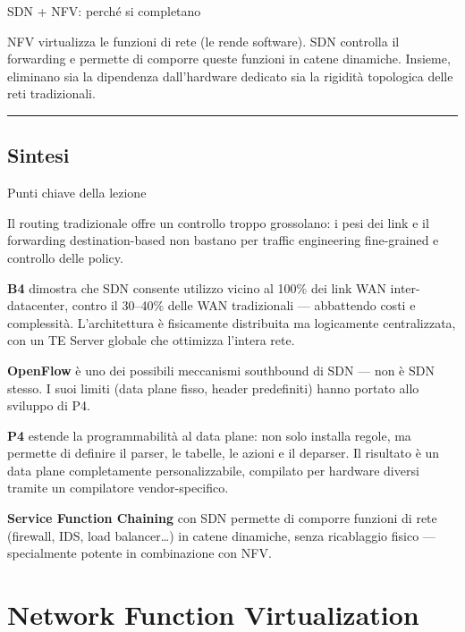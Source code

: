 \documentclass[
  italian,
  openany]{book}
\begin{document}
\begin{callouttip}{SDN + NFV: perché si completano}

NFV virtualizza le funzioni di rete (le rende software). SDN controlla
il forwarding e permette di comporre queste funzioni in catene
dinamiche. Insieme, eliminano sia la dipendenza dall'hardware dedicato
sia la rigidità topologica delle reti tradizionali.

\end{callouttip}

\begin{center}\rule{0.5\linewidth}{0.5pt}\end{center}

\section{Sintesi}\label{sintesi}

\begin{calloutnote}{Punti chiave della lezione}

Il routing tradizionale offre un controllo troppo grossolano: i pesi dei
link e il forwarding destination-based non bastano per traffic
engineering fine-grained e controllo delle policy.

\textbf{B4} dimostra che SDN consente utilizzo vicino al 100\% dei link
WAN inter-datacenter, contro il 30--40\% delle WAN tradizionali ---
abbattendo costi e complessità. L'architettura è fisicamente distribuita
ma logicamente centralizzata, con un TE Server globale che ottimizza
l'intera rete.

\textbf{OpenFlow} è uno dei possibili meccanismi southbound di SDN ---
non è SDN stesso. I suoi limiti (data plane fisso, header predefiniti)
hanno portato allo sviluppo di P4.

\textbf{P4} estende la programmabilità al data plane: non solo installa
regole, ma permette di definire il parser, le tabelle, le azioni e il
deparser. Il risultato è un data plane completamente personalizzabile,
compilato per hardware diversi tramite un compilatore vendor-specifico.

\textbf{Service Function Chaining} con SDN permette di comporre funzioni
di rete (firewall, IDS, load balancer\ldots) in catene dinamiche, senza
ricablaggio fisico --- specialmente potente in combinazione con NFV.

\end{calloutnote}

\newpage

\chapter{Network Function
Virtualization}\label{network-function-virtualization}
\end{document}
